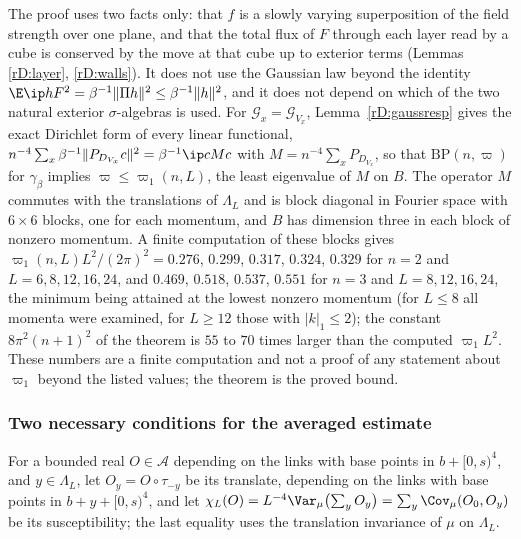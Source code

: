 \begin{remark}
\label{rD:maxwellremark}
The proof uses two facts only: that $f$ is a slowly varying superposition
of the field strength over one plane, and that the total flux of $F$
through each layer read by a cube is conserved by the move at that cube up
to exterior terms (Lemmas \ref{rD:layer}, \ref{rD:walls}). It does not use
the Gaussian law beyond the identity $\E\ip hF^2=\beta^{-1}\lVert\Pi h
\rVert^2\le\beta^{-1}\lVert h\rVert^2$, and it does not depend on which of
the two natural exterior $\sigma$-algebras is used. For $\mathcal G_x=
\mathcal G_{V_x}$, Lemma~\ref{rD:gaussresp} gives the exact Dirichlet form
of every linear functional, $n^{-4}\sum_x\beta^{-1}\lVert P_{D_{V_x}}c
\rVert^2=\beta^{-1}\ip c{Mc}$ with $M=n^{-4}\sum_xP_{D_{V_x}}$, so that
$\mathrm{BP}(n,\varpi)$ for $\gamma_\beta$ implies $\varpi\le\varpi_1(n,L)$,
the least eigenvalue of $M$ on $B$. The operator $M$ commutes with the
translations of $\Lambda_L$ and is block diagonal in Fourier space with
$6\times6$ blocks, one for each momentum, and $B$ has dimension three in
each block of nonzero momentum. A finite computation of these blocks
gives $\varpi_1(n,L)L^2/(2\pi)^2=0.276$, $0.299$, $0.317$, $0.324$, $0.329$
for $n=2$ and $L=6,8,12,16,24$, and $0.469$, $0.518$, $0.537$, $0.551$ for
$n=3$ and $L=8,12,16,24$, the minimum being attained at the lowest nonzero
momentum (for $L\le8$ all momenta were examined, for $L\ge12$ those with
$\lvert k\rvert_1\le2$); the constant $8\pi^2(n+1)^2$ of the theorem is
$55$ to $70$ times larger than the computed $\varpi_1L^2$. These numbers are
a finite computation and not a proof of any statement about $\varpi_1$
beyond the listed values; the theorem is the proved bound.
\end{remark}

\subsubsection{Two necessary conditions for the averaged estimate}

For a bounded real $O\in\mathcal A$ depending on the links with base points
in $b+[0,s)^4$, and $y\in\Lambda_L$, let $O_y=O\circ\tau_{-y}$ be its
translate, depending on the links with base points in $b+y+[0,s)^4$, and
let $\chi_L(O)=L^{-4}\Var_\mu\bigl(\sum_yO_y\bigr)=\sum_y\Cov_\mu(O_0,O_y)$
be its susceptibility; the last equality uses the translation invariance
of $\mu$ on $\Lambda_L$.

